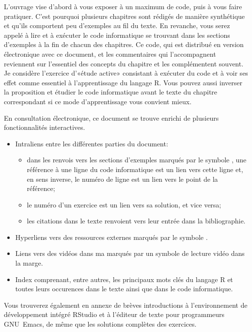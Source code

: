 L'ouvrage vise d'abord à vous exposer à un maximum de code, puis à
vous faire pratiquer. C'est pourquoi plusieurs chapitres sont rédigés
de manière synthétique et qu'ils comportent peu d'exemples au fil du
texte. En revanche, vous serez appelé à lire et à exécuter le code
informatique se trouvant dans les sections d'exemples à la fin de
chacun des chapitres. Ce code, qui est distribué en version
électronique avec ce document, et les commentaires qui l'accompagnent
reviennent sur l'essentiel des concepts du chapitre et les
complémentent souvent. Je considère l'exercice d'«étude active»
consistant à exécuter du code et à voir ses effet comme essentiel à
l'apprentissage du langage R. Vous pouvez aussi inverser la
proposition et étudier le code informatique avant le texte du chapitre
correspondant si ce mode d'apprentissage vous convient mieux.

En consultation électronique, ce document se trouve enrichi de
plusieurs fonctionnalités interactives.
\begin{itemize}
\item Intraliens entre les différentes parties du document:
  \begin{itemize}
  \item dans les renvois vers les sections d'exemples marqués par le
    symbole {\faMapSigns}, une référence à une ligne du code
    informatique est un lien vers cette ligne et, en sens inverse, le
    numéro de ligne est un lien vers le point de la
    référence;
  \item le numéro d'un exercice est un lien vers sa solution, et vice
    versa;
  \item les citations dans le texte renvoient vers leur entrée dans la
    bibliographie.
  \end{itemize}

\item Hyperliens vers des ressources externes marqués par le symbole
  {\smaller\faExternalLink}.
\item Liens vers des vidéos dans ma %
  marqués par un symbole de lecture vidéo {\smaller\faYoutubePlay} dans la
  marge.
\item Index comprenant, entre autres, les principaux mots clés du
  langage R et toutes leurs occurences dans le texte ainsi que
  dans le code informatique.
\end{itemize}

Vous trouverez également en annexe de brèves introductions à
l'environnement de développement intégré RStudio et à l'éditeur de
texte pour programmeurs GNU~Emacs, de même que les solutions complètes
des exercices.

